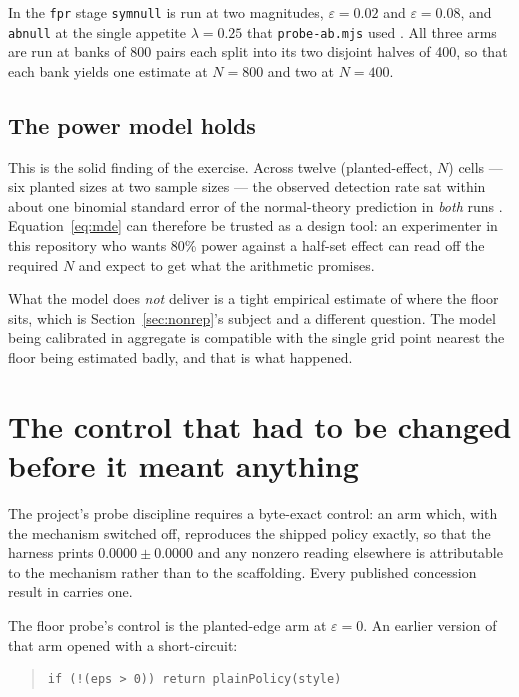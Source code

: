 \documentclass[11pt]{article}
\newcommand{\code}[1]{\texttt{#1}}
\begin{document}
In the \code{fpr} stage \code{symnull} is run at two magnitudes, $\varepsilon = 0.02$ and
$\varepsilon = 0.08$, and \code{abnull} at the single appetite $\lambda = 0.25$ that
\code{probe-ab.mjs} used \cite{probefloor}. All three arms are run at banks of 800 pairs each split
into its two disjoint halves of 400, so that each bank yields one estimate at $N=800$ and two at
$N=400$.

\subsection{The power model holds}

This is the solid finding of the exercise. Across twelve (planted-effect, $N$) cells --- six planted
sizes at two sample sizes --- the observed detection rate sat within about one binomial standard
error of the normal-theory prediction in \emph{both} runs \cite{concession}. Equation~\eqref{eq:mde}
can therefore be trusted as a design tool: an experimenter in this repository who wants 80\% power
against a half-set effect can read off the required $N$ and expect to get what the arithmetic
promises.

What the model does \emph{not} deliver is a tight empirical estimate of where the floor sits, which
is Section~\ref{sec:nonrep}'s subject and a different question. The model being calibrated in
aggregate is compatible with the single grid point nearest the floor being estimated badly, and that
is what happened.

\section{The control that had to be changed before it meant anything}
\label{sec:control}

The project's probe discipline requires a byte-exact control: an arm which, with the mechanism
switched off, reproduces the shipped policy exactly, so that the harness prints
$0.0000 \pm 0.0000$ and any nonzero reading elsewhere is attributable to the mechanism rather than to
the scaffolding. Every published concession result in \cite{concession} carries one.

The floor probe's control is the planted-edge arm at $\varepsilon = 0$. An earlier version of that
arm opened with a short-circuit:

\begin{quote}
\begin{verbatim}
if (!(eps > 0)) return plainPolicy(style)
\end{verbatim}
\end{quote}
\end{document}
